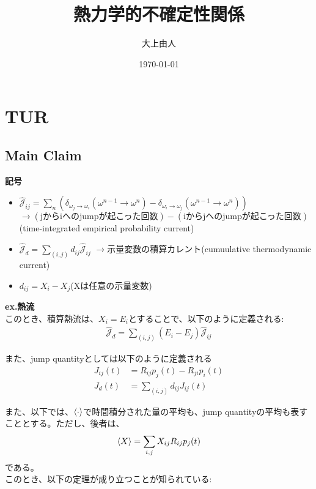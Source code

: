 \documentclass[a4paper,11pt]{jsarticle}
\numberwithin{equation}{section}
\begin{document}
\title{熱力学的不確定性関係}
\author{大上由人}
\date{\today}
\maketitle

\section{TUR}
\subsection{Main Claim}
\textbf{記号}
\begin{itemize}
    \item $\hat{\mathcal{J}}_{ij} = \sum_{n} (\delta_{\omega_j \to \omega_i}(\omega^{n-1}\to \omega^n) - \delta_{\omega_i \to \omega_j}(\omega^{n-1}\to \omega^n))$\\
$\to (\text{jからiへのjumpが起こった回数})-(\text{iからjへのjumpが起こった回数})$(time-integrated empirical probability current)\\
    \item $\hat{\mathcal{J}}_{d} = \sum_{(i,j)} d_{ij} \hat{\mathcal{J}}_{ij}$
$\to$示量変数の積算カレント(cumuulative thermodynamic current)
    \item $d_{ij} = X_i - X_j$(Xは任意の示量変数)
\end{itemize}

\textbf{ex.熱流}\\
このとき、積算熱流は、$X_i = E_i$とすることで、以下のように定義される:
\begin{align}
    \hat{\mathcal{J}}_{d} = \sum_{(i,j)} (E_i - E_j) \hat{\mathcal{J}}_{ij}
\end{align}

また、jump quantityとしては以下のように定義される\\
\begin{align}
    {J}_{ij}(t) &= R_{ij}p_j(t) - R_{ji}p_i(t)\\
    {J}_{d}(t) &= \sum_{(i,j)} d_{ij} {J}_{ij}(t)
\end{align}

また、以下では、$\ev{\cdot}$で時間積分された量の平均も、jump quantityの平均も表すこととする。ただし、後者は、
\begin{align}
    \ev{X} = \sum_{i,j} X_{ij} R_{ij}p_j(t)
\end{align}
である。\\

このとき、以下の定理が成り立つことが知られている:
\end{document}
